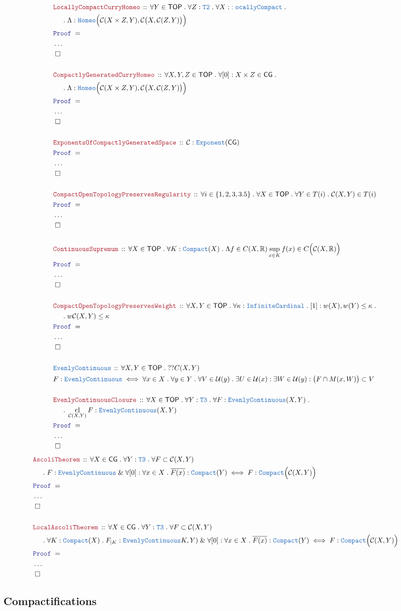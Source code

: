 \documentclass[12pt]{scrartcl}
\newcommand{\TYPE}[1]{\textcolor{NavyBlue}{\mathtt{#1}}}
\newcommand{\LOGIC}[1]{\textcolor{Blue}{\mathtt{#1}}}
\newcommand{\THM}[1]{\textcolor{Maroon}{\mathtt{#1}}}
\renewcommand{\.}{\; . \;}
\newcommand{\Theorem}[2]{& \THM{#1} \, :: \, #2 \\ & \Proof = \\ }
\newcommand{\DeclareType}[2]{& \TYPE{#1} \, :: \, #2 \\}
\newcommand{\DefineType}[3]{& #1 : \TYPE{#2} \iff #3 \\}
\newcommand{\NewLine}{\\ & \kern 1pc}
\newcommand{\Page}[1]{ \begin{align*} #1 \end{align*}   }
\newcommand{\NoProof}{ & \ldots \\ \EndProof}
\renewcommand{\And}{\; \& \;}
\newcommand{\Reals}{\mathbb{R} }
\newcommand{\QED}{\; \square}
\newcommand{\EndProof}{& \QED \\}
\newcommand{\Proof}{\LOGIC{Proof} \; }
\newcommand{\C}{\mathcal{C}}
\DeclareMathOperator*{\cl}{cl}
\newcommand{\TOP}{\mathsf{TOP}}
\newcommand{\CG}{\mathsf{CG}}
\newcommand{\U}{\mathcal{U}}
\begin{document}
\Page{
	\Theorem{LocallyCompactCurryHomeo}
	{
		\forall Y \in \TOP \.
		\forall Z : \TYPE{T2} \. 
		\forall X : \TYPE{:ocallyCompact} \.
		\NewLine \. 
		\Lambda : \TYPE{Homeo}\Big( \C(X \times Z, Y), \C\big(X,\C(Z,Y)\big) \Big)
	}
	\NoProof
	\\
	\Theorem{CompactlyGeneratedCurryHomeo}
	{
		\forall X,Y,Z \in \TOP \.
		\forall [0] : X \times Z \in \CG \. 
		\NewLine \. 
		\Lambda : \TYPE{Homeo}\Big( \C(X \times Z, Y), \C\big(X,\C(Z,Y)\big) \Big)
	}
	\NoProof
	\\
	\Theorem{ExponentsOfCompactlyGeneratedSpace}
	{
		\C : \TYPE{Exponent}(\CG)
	}
	\NoProof
	\\
	\Theorem{CompactOpenTopologyPreservesRegularity}
	{
		\forall i \in \{1,2,3,3.5 \} \. 
		\forall X \in \TOP \.
		\forall Y \in T(i) \.
		\C(X,Y) \in T(i)
	}
	\NoProof
	\\
	\Theorem{ContinuousSupremum}
	{
		\forall X \in \TOP \.
		\forall K : \TYPE{Compact}(X) \. 
		\Lambda f \in  C(X,\Reals)  \sup_{x \in K} f(x)  \in C\Big( \C(X,\Reals) \Big)
	}
	\NoProof
	\\
	\Theorem{CompactOpenTopologyPreservesWeight}
	{
		\forall X, Y \in \TOP \. 
		\forall \kappa : \TYPE{InfiniteCardinal} \.
		[1] : w(X),w(Y) \le \kappa \. \NewLine \. 
		w\C(X,Y) \le \kappa
	}
	\NoProof
	\\
	\DeclareType{EvenlyContinuous}
	{
		\forall X,Y \in \TOP \. ??C(X,Y) 
	}
	\DefineType{F}{\TYPE{EvenlyContinuous}}{
		\forall x \in X \. \forall y \in Y \.  \forall V \in \U(y) \.
		\exists U \in \U(x) : \exists W \in \U(y) : 
		\big(F \cap M(x,W)\big) \subset V
	}
	\\
	\Theorem{EvenlyContinuousClosure}
	{
		\forall X \in \TOP \.
		\forall Y : \TYPE{T3} \.
		\forall F : \TYPE{EvenlyContinuous}(X,Y) \. \NewLine \.
		\cl_{\C(X,Y)} F : \TYPE{EvenlyContinuous}(X,Y)
	}
	\NoProof
}
\Page{
	\Theorem{AscoliTheorem}
	{
		\forall X \in \CG \.
		\forall Y  : \TYPE{T3} \.
		\forall F \subset \C(X,Y)   \NewLine \.
		F : \TYPE{EvenlyContinuous}  \And  
		\forall [0] : \forall x \in X \. \overline{F(x)} : \TYPE{Compact}(Y) \iff
		F : \TYPE{Compact}\Big( \C(X,Y)\Big)
	}
	\NoProof
	\\
	\Theorem{LocalAscoliTheorem}
	{
		\forall X \in \CG \.
		\forall Y  : \TYPE{T3} \.
		\forall F \subset \C(X,Y)   \NewLine \.
		\forall K : \TYPE{Compact}(X) \. F_{|K} : \TYPE{EvenlyContinuous}K,Y )  \And  
		\forall [0] : \forall x \in X \. \overline{F(x)} : \TYPE{Compact}(Y) \iff
		F : \TYPE{Compact}\Big( \C(X,Y)\Big)
	}
	\NoProof
}
\newpage
\subsection{Compactifications}
\end{document}
